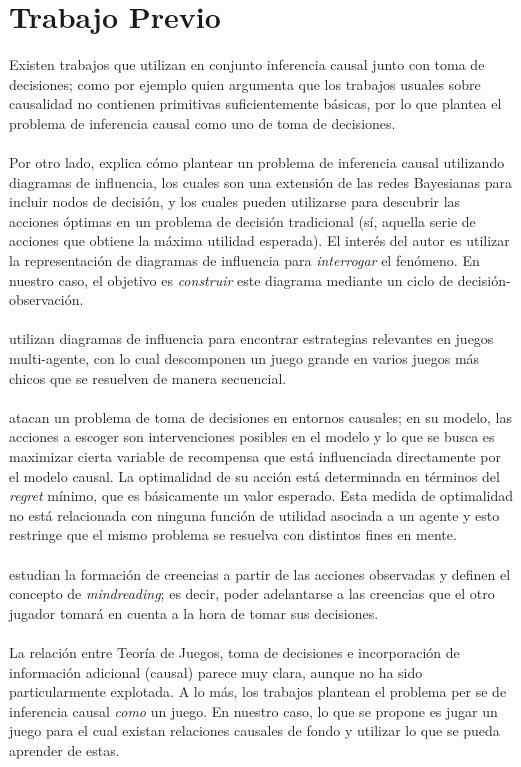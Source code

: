 \documentclass[11pt]{article}
\theoremstyle{plain}
\begin{document}
\section{Trabajo Previo}
Existen trabajos que utilizan en conjunto inferencia causal junto con toma de decisiones; como por ejemplo \cite{heckerman1995decision} quien argumenta que los trabajos usuales sobre causalidad no contienen primitivas suficientemente básicas, por lo que plantea el problema de inferencia causal como uno de toma de decisiones.\\
\\
Por otro lado, \cite{dawid2002influence} explica cómo plantear un problema de inferencia causal utilizando diagramas de influencia, los cuales son una extensión de las redes Bayesianas para incluir nodos de decisión, y los cuales pueden utilizarse para descubrir las acciones óptimas en un problema de decisión tradicional (sí, aquella serie de acciones que obtiene la máxima utilidad esperada). El interés del autor es utilizar la representación de diagramas de influencia para \textit{interrogar} el fenómeno. En nuestro caso, el objetivo es \textit{construir} este diagrama mediante un ciclo de decisión-observación.\\
\\
\cite{koller2003multi} utilizan diagramas de influencia para encontrar estrategias relevantes en juegos multi-agente, con lo cual descomponen un juego grande en varios juegos más chicos que se resuelven de manera secuencial.\\
\\
\cite{lattimoreNIPS2016} atacan un problema de toma de decisiones en entornos causales; en su modelo, las acciones a escoger son intervenciones posibles en el modelo y lo que se busca es maximizar cierta variable de recompensa que está influenciada directamente por el modelo causal. La optimalidad de su acción está determinada en términos del \textit{regret} mínimo, que es básicamente un valor esperado. Esta medida de optimalidad no está relacionada con ninguna función de utilidad asociada a un agente y esto restringe que el mismo problema se resuelva con distintos fines en mente.\\
\\
\cite{larrouy2017mindreading} estudian la formación de creencias a partir de las acciones observadas y definen el concepto de \textit{mindreading}; es decir, poder adelantarse a las creencias que el otro jugador tomará en cuenta a la hora de tomar sus decisiones.\\
\\
La relación entre Teoría de Juegos, toma de decisiones e incorporación de información adicional (causal) parece muy clara, aunque no ha sido particularmente explotada. A lo más, los trabajos plantean el problema per se de inferencia causal \textit{como} un juego. En nuestro caso, lo que se propone es jugar un juego para el cual existan relaciones causales de fondo y utilizar lo que se pueda aprender de estas.
\end{document}
